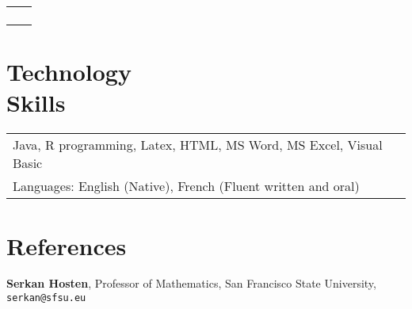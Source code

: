 \documentclass[margin,line,pifont,palatino,courier]{res}
\newenvironment{list1}{
  \begin{list}{\ding{113}}{%
      \setlength{\itemsep}{0in}
      \setlength{\parsep}{0in} \setlength{\parskip}{0in}
      \setlength{\topsep}{0in} \setlength{\partopsep}{0in}
      \setlength{\leftmargin}{0.17in}}}{\end{list}}
\begin{document}
\begin{resume}
\begin{tabular}{@{}p{5in}p{3in}}
\begin{list1}
\end{list1}

\end{tabular}

\section{\sc Technology \\ Skills}

\begin{tabular}{@{}p{6in}p{3in}}

Java, R programming, Latex, HTML, MS Word, MS Excel, Visual Basic\\
Languages:  English (Native), French (Fluent written and oral)\\

\end{tabular}




\section{\sc References}

{\bf Serkan Hosten}, Professor of Mathematics, San Francisco State University,
\texttt{serkan@sfsu.eu}




\end{resume}
\end{document}

